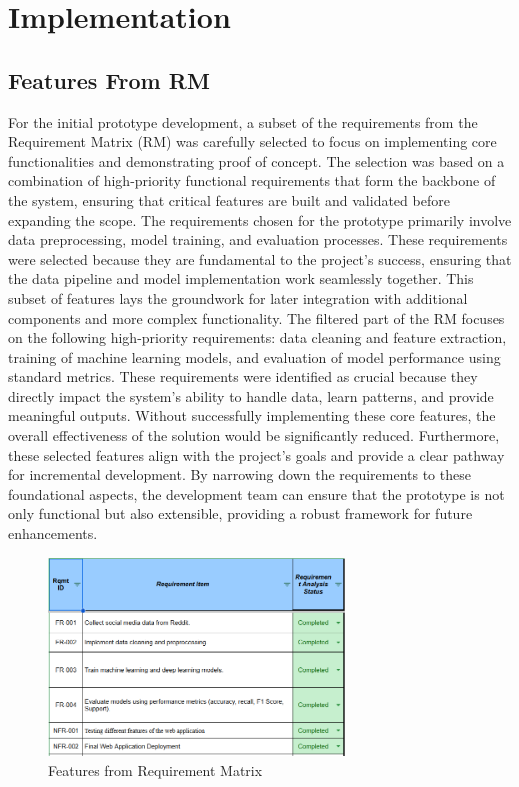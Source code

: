 

\section{Implementation}
\subsection{Features From RM}
\noindent
For the initial prototype development, a subset of the requirements from the Requirement Matrix (RM) was carefully selected to focus on implementing core functionalities and demonstrating proof of concept. The selection was based on a combination of high-priority functional requirements that form the backbone of the system, ensuring that critical features are built and validated before expanding the scope. The requirements chosen for the prototype primarily involve data preprocessing, model training, and evaluation processes. These requirements were selected because they are fundamental to the project's success, ensuring that the data pipeline and model implementation work seamlessly together. This subset of features lays the groundwork for later integration with additional components and more complex functionality. The filtered part of the RM focuses on the following high-priority requirements: data cleaning and feature extraction, training of machine learning models, and evaluation of model performance using standard metrics. These requirements were identified as crucial because they directly impact the system's ability to handle data, learn patterns, and provide meaningful outputs. Without successfully implementing these core features, the overall effectiveness of the solution would be significantly reduced. Furthermore, these selected features align with the project’s goals and provide a clear pathway for incremental development. By narrowing down the requirements to these foundational aspects, the development team can ensure that the prototype is not only functional but also extensible, providing a robust framework for future enhancements.

\begin{figure}[h!]  
    \centering
    \includegraphics[width=0.7\textwidth]{Images/RM_part_for_implementation.png}  
    \caption{Features from Requirement Matrix}
    \label{Features from Requirement Matrix}  %
\end{figure}

